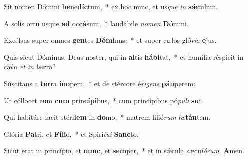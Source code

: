 \setcounter{versecount}{2}

\vs Sit nomen Dómini \textbf{be}ne\textbf{díc}tum,~* ex hoc nunc, et us\textit{que} \textit{in} \textbf{sǽ}culum.

\vs A solis ortu usque \textbf{ad} oc\textbf{cá}sum,~* laudábile \textit{no}\textit{men} \textbf{Dó}mini.

\vs Excélsus super omnes \textbf{gen}tes \textbf{Dó}\textbf{mi}nus,~* et super cælos gló\textit{ri}\textit{a} \textbf{e}jus.

\vs Quis sicut Dóminus, Deus noster, qui in \textbf{al}tis \textbf{há}\textbf{bi}tat,~* et humília réspicit in cælo \textit{et} \textit{in} \textbf{ter}ra?

\vs Súscitans a \textbf{ter}ra \textbf{ín}\textbf{o}pem,~* et de stércore é\textit{ri}\textit{gens} \textbf{páu}perem:

\vs Ut cóllocet eum \textbf{cum} prin\textbf{cí}\textbf{pi}bus,~* cum princípibus pó\textit{pu}\textit{li} \textbf{su}i.

\vs Qui habitáre facit stéri\textbf{lem} in \textbf{do}mo,~* matrem filió\textit{rum} \textit{læ}\textbf{tán}tem.

\vs Glória \textbf{Pa}tri, et \textbf{Fí}\textbf{li}o,~* et Spirí\textit{tu}\textit{i} \textbf{Sanc}to.

\vs Sicut erat in princípio, et \textbf{nunc}, et \textbf{sem}per,~* et in sǽcula sæcu\textit{ló}\textit{rum}. \textbf{A}men.

